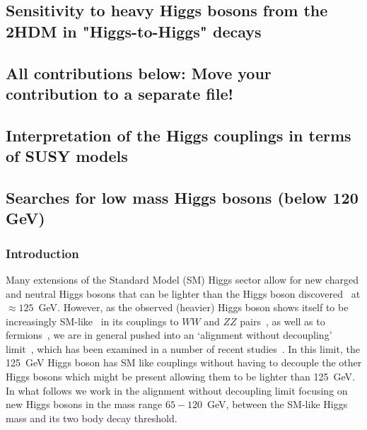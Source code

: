 \documentclass[../report.tex]{subfiles}
\providecommand{\main}{..}
\begin{document}
\subsection{Sensitivity to heavy Higgs bosons from the 2HDM in "Higgs-to-Higgs" decays}


\vspace{5cm}
\subsection{All contributions below: Move your contribution to a separate file!}

\clearpage

\subsection{Interpretation of the Higgs couplings in terms of SUSY models}




\subsection{Searches for low mass Higgs bosons (below 120 GeV)}


\subsubsection{Introduction}\label{sec:intro}

Many extensions of the Standard Model (SM) Higgs sector allow for new
charged and neutral Higgs bosons that can be lighter than the Higgs
boson discovered~\cite{Aad:2012tfa,Chatrchyan:2012xdj} at $\approx 125$~GeV. 
However, as the observed (heavier) Higgs boson shows itself to be 
increasingly SM-like~\cite{Falkowski:2013dza} in its couplings to $WW$
and $ZZ$ pairs~\cite{Khachatryan:2014kca,Khachatryan:2016vau,Sirunyan:2017exp,Sirunyan:2017tqd,Aaboud:2017oem,Falkowski:2013dza},
as well as to fermions~\cite{Aaboud:2018zhk,CMS:2018abb}, we are in
general pushed into an `alignment without decoupling'
limit~\cite{Gunion:2002zf,Carena:2013ooa}, which has been examined in a
number of recent
studies~\cite{Craig:2013hca,Carena:2014nza,Carena:2015moc,Bernon:2015wef,Profumo:2016zxo,Bechtle:2016kui,Haber:2017erd,Bahl:2018zmf}. In
this limit, the 125~GeV Higgs boson has SM like couplings without having
to decouple the other Higgs bosons which might be present allowing them
to be lighter than 125~GeV. In what follows we work in the alignment
without decoupling limit focusing on new Higgs bosons in the mass range
$65 - 120$~GeV, between the SM-like Higgs mass and its two body decay
threshold. 
\end{document}
